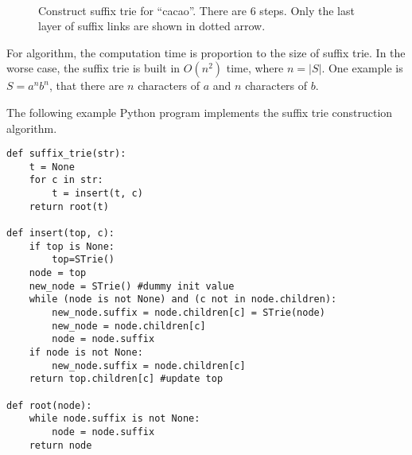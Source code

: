 \documentclass{article}
\begin{document}
\begin{figure}[htbp]
  \centering
   \\
  \caption{Construct suffix trie for ``cacao''. There are 6 steps. Only the last layer of suffix links are shown in dotted arrow.}
  \label{fig:cons-strie-cacao}
\end{figure}

For  algorithm, the computation time
is proportion to the size of suffix trie. In the worse case, the suffix trie is
built in $O(n^2)$ time, where $n = |S|$. One example is $S=a^nb^n$, that there are $n$
characters of $a$ and $n$ characters of $b$.

The following example Python program implements the suffix trie construction algorithm.

\lstset{language=Python}
\begin{lstlisting}
def suffix_trie(str):
    t = None
    for c in str:
        t = insert(t, c)
    return root(t)

def insert(top, c):
    if top is None:
        top=STrie()
    node = top
    new_node = STrie() #dummy init value
    while (node is not None) and (c not in node.children):
        new_node.suffix = node.children[c] = STrie(node)
        new_node = node.children[c]
        node = node.suffix
    if node is not None:
        new_node.suffix = node.children[c]
    return top.children[c] #update top

def root(node):
    while node.suffix is not None:
        node = node.suffix
    return node
\end{lstlisting}
\end{document}
